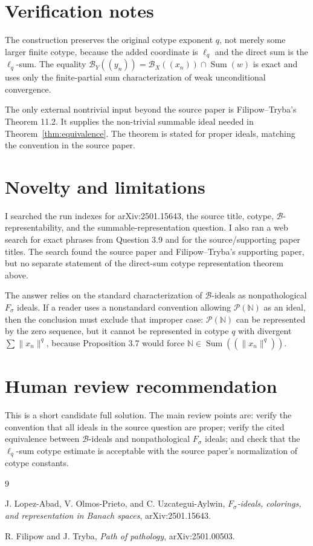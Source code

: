\documentclass[11pt]{amsart}
\newcommand{\N}{\mathbb N}
\newcommand{\B}{\mathcal B}
\newcommand{\Sum}{\operatorname{Sum}}
\begin{document}
\section*{Verification notes}

The construction preserves the original cotype exponent \(q\), not merely some
larger finite cotype, because the added coordinate is \(\ell_q\) and the direct
sum is the \(\ell_q\)-sum.  The equality
\(\B_Y((y_n))=\B_X((x_n))\cap\Sum(w)\) is exact and uses only the finite-partial
sum characterization of weak unconditional convergence.

The only external nontrivial input beyond the source paper is Filipow--Tryba's
Theorem 11.2.  It supplies the non-trivial summable ideal needed in
Theorem~\ref{thm:equivalence}.  The theorem is stated for proper ideals, matching
the convention in the source paper.

\section*{Novelty and limitations}

I searched the run indexes for arXiv:2501.15643, the source title, cotype,
\(\B\)-representability, and the summable-representation question.  I also ran a
web search for exact phrases from Question 3.9 and for the source/supporting
paper titles.  The search found the source paper and Filipow--Tryba's supporting
paper, but no separate statement of the direct-sum cotype representation theorem
above.

The answer relies on the standard characterization of \(\B\)-ideals as
nonpathological \(F_\sigma\) ideals.  If a reader uses a nonstandard convention
allowing \(\mathcal P(\N)\) as an ideal, then the conclusion must exclude that
improper case: \(\mathcal P(\N)\) can be represented by the zero sequence, but it
cannot be represented in cotype \(q\) with divergent \(\sum\|x_n\|^q\), because
Proposition 3.7 would force \(\N\in \Sum((\|x_n\|^q))\).

\section*{Human review recommendation}

This is a short candidate full solution.  The main review points are:
verify the convention that all ideals in the source question are proper; verify
the cited equivalence between \(\B\)-ideals and nonpathological \(F_\sigma\)
ideals; and check that the \(\ell_q\)-sum cotype estimate is acceptable with the
source paper's normalization of cotype constants.

\begin{thebibliography}{9}

J. Lopez-Abad, V. Olmos-Prieto, and C. Uzcategui-Aylwin,
\emph{\(F_\sigma\)-ideals, colorings, and representation in Banach spaces},
arXiv:2501.15643.

R. Filipow and J. Tryba,
\emph{Path of pathology},
arXiv:2501.00503.

\end{thebibliography}
\end{document}
